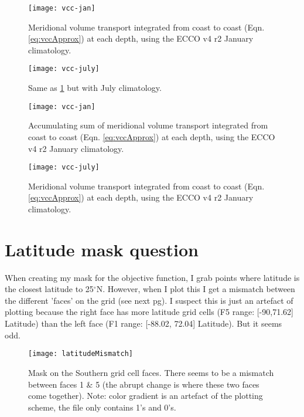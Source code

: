 \documentclass[a4paper,11pt]{article}
\begin{document}
  \begin{figure}
   \centering
   \texttt{[image: vcc-jan]}
   \caption{Meridional volume transport integrated from coast to coast (Eqn. \ref{eq:vccApprox}) at each depth, using the ECCO v4 r2 January climatology.}
   \label{fig:vcc-jan}
  \end{figure}
  
  \begin{figure}
   \centering
   \texttt{[image: vcc-july]}
   \caption{Same as \ref{fig:vcc-jan} but with July climatology.}
   \label{fig:vcc-july}
  \end{figure}

  \begin{figure}
   \centering
   \texttt{[image: vcc-jan]}
   \caption{Accumulating sum of meridional volume transport integrated from coast to coast (Eqn. \ref{eq:vccApprox}) at each depth, using the ECCO v4 r2 January climatology.}
   \label{fig:amoc-jan}
  \end{figure}
  
  \begin{figure}
   \centering
   \texttt{[image: vcc-july]}
   \caption{Meridional volume transport integrated from coast to coast (Eqn. \ref{eq:vccApprox}) at each depth, using the ECCO v4 r2 January climatology.}
   \label{fig:amoc-july}
  \end{figure}
  
  \section{Latitude mask question}
  
  When creating my mask for the objective function, I grab points where latitude is the closest latitude to 25$^{\circ}$N. However, when I plot this I get a mismatch between the different 'faces' on the grid (see next pg). I suspect this is just an artefact of plotting because the right face has more latitude grid cells (F5 range: [-90,71.62] Latitude) than the left face (F1 range: [-88.02, 72.04] Latitude). But it seems odd.
  
  \begin{figure}
   \centering
   \texttt{[image: latitudeMismatch]}
   \label{fig:latitudeMismatch}
   \caption{Mask on the Southern grid cell faces. There seems to be a mismatch between faces 1 \& 5 (the abrupt change is where these two faces come together). Note: color gradient is an artefact of the plotting scheme, the file only contains 1's and 0's.}
  \end{figure}
\end{document}
